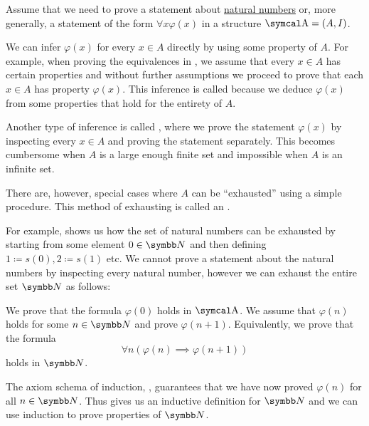 \begin{remark}\label{rem:induction}
  Assume that we need to prove a statement about \hyperref[def:natural_numbers]{natural numbers} or, more generally, a statement of the form \( \forall x \varphi(x) \) in a structure \( \CA = (A, I) \).

  We can infer \( \varphi(x) \) for every \( x \in A \) directly by using some property of \( A \). For example, when proving the equivalences in , we assume that every \( x \in A \) has certain properties and without further assumptions we proceed to prove that each \( x \in A \) has property \( \varphi(x) \). This inference is called  because we deduce \( \varphi(x) \) from some properties that hold for the entirety of \( A \).

  Another type of inference is called , where we prove the statement \( \varphi(x) \) by inspecting every \( x \in A \) and proving the statement separately. This becomes cumbersome when \( A \) is a large enough finite set and impossible when \( A \) is an infinite set.

  There are, however, special cases where \( A \) can be \enquote{exhausted} using a simple procedure. This method of exhausting is called an .

  For example,  shows us how the set of natural numbers can be exhausted by starting from some element \( 0 \in \BN \) and then defining \( 1 \coloneqq s(0), 2 \coloneqq s(1) \) etc. We cannot prove a statement about the natural numbers by inspecting every natural number, however we can exhaust the entire set \( \BN \) as follows:
  \begin{RemEnum}
     We prove that the formula \( \varphi(0) \) holds in \( \CA \).
     We assume that \( \varphi(n) \) holds for some \( n \in \BN \) and prove \( \varphi(n + 1) \). Equivalently, we prove that the formula
          \begin{equation*}
            \forall n (\varphi(n) \implies \varphi(n + 1))
          \end{equation*}
          holds in \( \BN \).
  \end{RemEnum}

  The axiom schema of induction, , guarantees that we have now proved \( \varphi(n) \) for all \( n \in \BN \). Thus  gives us an inductive definition for \( \BN \) and we can use induction to prove properties of \( \BN \).


\end{remark}
